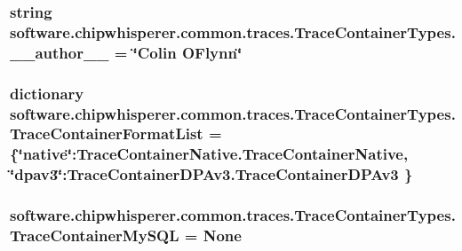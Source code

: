\subsubsection[{\+\_\+\+\_\+author\+\_\+\+\_\+}]{\setlength{\rightskip}{0pt plus 5cm}string software.\+chipwhisperer.\+common.\+traces.\+Trace\+Container\+Types.\+\_\+\+\_\+author\+\_\+\+\_\+ = \char`\"{}Colin O\textquotesingle{}Flynn\char`\"{}}\label{namespacesoftware_1_1chipwhisperer_1_1common_1_1traces_1_1TraceContainerTypes_ac6eecf4c3deaf44015ccb8644a722e72}
\hypertarget{namespacesoftware_1_1chipwhisperer_1_1common_1_1traces_1_1TraceContainerTypes_a41a0db71001b2c37376e4d7cf1aa3a77}{}
\subsubsection[{Trace\+Container\+Format\+List}]{\setlength{\rightskip}{0pt plus 5cm}dictionary software.\+chipwhisperer.\+common.\+traces.\+Trace\+Container\+Types.\+Trace\+Container\+Format\+List = \{\char`\"{}native\char`\"{}\+:Trace\+Container\+Native.\+Trace\+Container\+Native, \char`\"{}dpav3\char`\"{}\+:Trace\+Container\+D\+P\+Av3.\+Trace\+Container\+D\+P\+Av3 \}}\label{namespacesoftware_1_1chipwhisperer_1_1common_1_1traces_1_1TraceContainerTypes_a41a0db71001b2c37376e4d7cf1aa3a77}
\hypertarget{namespacesoftware_1_1chipwhisperer_1_1common_1_1traces_1_1TraceContainerTypes_a5ccdf562e9a1170ae11724df37258848}{}
\subsubsection[{Trace\+Container\+My\+S\+Q\+L}]{\setlength{\rightskip}{0pt plus 5cm}software.\+chipwhisperer.\+common.\+traces.\+Trace\+Container\+Types.\+Trace\+Container\+My\+S\+Q\+L = None}\label{namespacesoftware_1_1chipwhisperer_1_1common_1_1traces_1_1TraceContainerTypes_a5ccdf562e9a1170ae11724df37258848}
